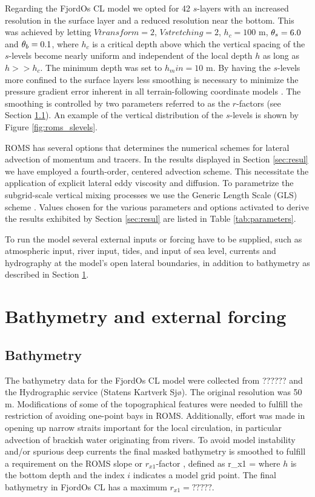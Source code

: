 Regarding the FjordOs CL model we opted for 42 $s$-layers with an increased resolution in the surface layer and a reduced resolution near the bottom. This was achieved by letting $Vtransform=2$, $Vstretching=2$, $h_c = 100$ m, $\theta_s = 6.0$ and $\theta_b = 0.1$, where $h_c$ is a critical depth above which the vertical spacing of the $s$-levels become nearly uniform and independent of the local depth $h$ as long as $h >> h_c$. The minimum depth was set to $h_min=10$ m. By having the $s$-levels more confined to the surface layers less smoothing is necessary to minimize the pressure gradient error inherent in all terrain-following coordinate models \citep{haney:1991}. The smoothing is controlled by two parameters referred to as the $r$-factors (see Section \ref{subsec:bathy}). An example of the vertical distribution of the $s$-levels is shown by Figure \ref{fig:roms_slevels}.


ROMS has several options that determines the numerical schemes for lateral advection of momentum and tracers. In the results displayed in Section \ref{sec:resul} we have employed a fourth-order, centered advection scheme. This necessitate the application of explicit lateral eddy viscosity and diffusion. To parametrize the subgrid-scale vertical mixing processes we use the Generic Length Scale (GLS) scheme  \citep{umlau:burch:2003}. Values chosen for the various parameters and options activated to derive the results exhibited by Section \ref{sec:resul} are listed in Table \ref{tab:parameters}. 

To run the model several external inputs or forcing have to be supplied, such as atmospheric input, river input, tides, and input of sea level, currents and hydrography at the model's open lateral boundaries, in addition to bathymetry as described in Section \ref{sec:forcing}.   


\section{Bathymetry and external forcing}
\label{sec:forcing}
\subsection{Bathymetry}
\label{subsec:bathy}
The bathymetry data for the FjordOs CL model were collected from ?????? and the Hydrographic service (Statens Kartverk Sj{\o}). The original resolution was 50 m. Modifications of some of the topographical features were needed to fulfill the restriction of avoiding one-point bays in ROMS. Additionally, effort was made in opening up narrow straits important for the local circulation, in particular advection of brackish water originating from rivers. To avoid model instability and/or spurious deep currents the final masked bathymetry is smoothed to fulfill a requirement on the ROMS slope or $r_{x1}$-factor \citep{beckm:haidv:1993}, defined as
\be
 r_{x1} = 
\ee
where $h$ is the bottom depth and the index $i$ indicates a model grid point. The final bathymetry in FjordOs CL has a maximum $r_{x1} = ?????$.

